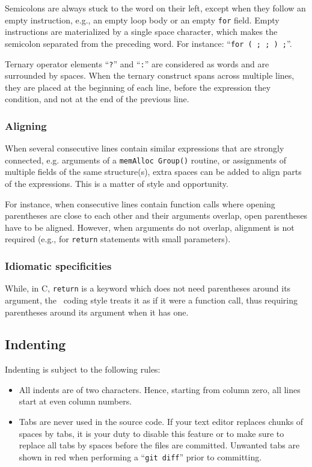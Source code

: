 Semicolons are always stuck to the word on their left, except when
they follow an empty instruction, e.g., an empty loop body or an empty
\texttt{for} field. Empty instructions are materialized by a single
space character, which makes the semicolon separated from the
preceding word. For instance: ``\texttt{for~(~;~;~)~;}''.

Ternary operator elements ``\texttt{?}'' and ``\texttt{:}'' are
considered as words and are surrounded by spaces. When the ternary
construct spans across multiple lines, they are placed at the
beginning of each line, before the expression they condition, and not
at the end of the previous line.

\subsubsection{Aligning}

When several consecutive lines contain similar expressions that are
strongly connected, e.g. arguments of a \texttt{mem\lbt Alloc\lbt
  Group()} routine, or assignments of multiple fields of the same
structure(s), extra spaces can be added to align parts of the
expressions. This is a matter of style and opportunity.

For instance, when consecutive lines contain function calls where
opening parentheses are close to each other and their arguments
overlap, open parentheses have to be aligned. However, when arguments
do not overlap, alignment is not required (e.g., for \texttt{return}
statements with small parameters).

\subsubsection{Idiomatic specificities}

While, in C, \texttt{return} is a keyword which does not need
parentheses around its argument, the \scotch\ coding style treats it
as if it were a function call, thus requiring parentheses around its
argument when it has one.

\subsection{Indenting}

Indenting is subject to the following rules:
\begin{itemize}
\item
  All indents are of two characters. Hence, starting from column zero,
  all lines start at even column numbers.
\item
  Tabs are never used in the source code. If your text editor replaces
  chunks of spaces by tabs, it is your duty to disable this feature or
  to make sure to replace all tabs by spaces before the files are
  committed. Unwanted tabs are shown in red when performing a
  ``\texttt{git diff}'' prior to committing.
\end{itemize}

